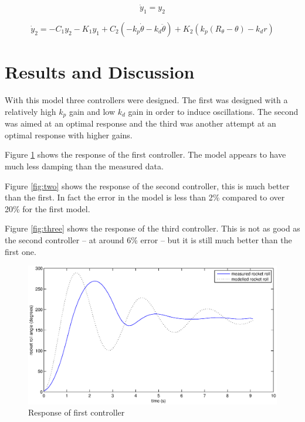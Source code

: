 \documentclass[a4paper,12pt]{article}
\begin{document}
    \begin{equation}
      \dot y_1 = y_2
    \end{equation}

    \begin{equation}
      \dot y_2 = -C_1 y_2 - K_1 y_1 + C_2 \left(-k_p \dot\theta - k_d \ddot\theta \right) + K_2 \left( k_p \left( R_\theta - \theta \right) - k_d r \right)
    \end{equation}

  \section{Results and Discussion}

    With this model three controllers were designed.  The first was designed
    with a relatively high $k_p$ gain and low $k_d$ gain in order to induce
    oscillations.  The second was aimed at an optimal response and the third was
    another attempt at an optimal response with higher gains.

    Figure \ref{fig:one} shows the response of the first controller.  The model
    appears to have much less damping than the measured data.

    Figure \ref{fig:two} shows the response of the second controller, this is
    much better than the first.  In fact the error in the model is less than 2\%
    compared to over 20\% for the first model.

    Figure \ref{fig:three} shows the response of the third controller.  This
    is not as good as the second controller -- at around 6\% error -- but it is
    still much better than the first one.

    \begin{figure}
      \centering
      \includegraphics[width=\textwidth]{one}
      \caption{Response of first controller}
      \label{fig:one}
    \end{figure}
\end{document}
